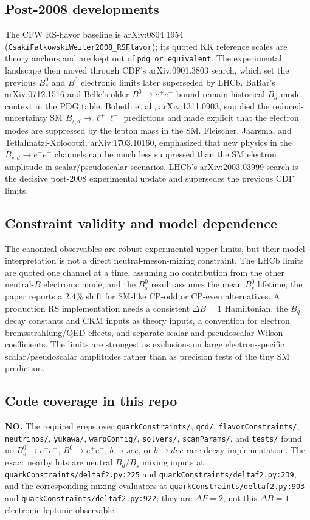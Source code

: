 \subsection*{Post-2008 developments}
The CFW RS-flavor baseline is arXiv:0804.1954
(\texttt{CsakiFalkowskiWeiler2008\_RSFlavor}); its quoted KK reference scales
are theory anchors and are kept out of \texttt{pdg\_or\_equivalent}.  The
experimental landscape then moved through CDF's arXiv:0901.3803 search, which
set the previous \(B_s^0\) and \(B^0\) electronic limits later superseded by
LHCb.  BaBar's arXiv:0712.1516 and Belle's older \(B^0\to e^+e^-\) bound remain
historical \(B_d\)-mode context in the PDG table.  Bobeth et al.,
arXiv:1311.0903, supplied the reduced-uncertainty SM \(B_{s,d}\to\ell^+\ell^-\)
predictions and made explicit that the electron modes are suppressed by the
lepton mass in the SM.  Fleischer, Jaarsma, and Tetlalmatzi-Xolocotzi,
arXiv:1703.10160, emphasized that new physics in the \(B_{s,d}\to e^+e^-\)
channels can be much less suppressed than the SM electron amplitude in
scalar/pseudoscalar scenarios.  LHCb's arXiv:2003.03999 search is the decisive
post-2008 experimental update and supersedes the previous CDF limits.

\subsection*{Constraint validity and model dependence}
The canonical observables are robust experimental upper limits, but their model
interpretation is not a direct neutral-meson-mixing constraint.  The LHCb limits
are quoted one channel at a time, assuming no contribution from the other
neutral-\(B\) electronic mode, and the \(B_s^0\) result assumes the mean
\(B_s^0\) lifetime; the paper reports a \(2.4\%\) shift for SM-like CP-odd or
CP-even alternatives.  A production RS implementation needs a consistent
\(\Delta B=1\) Hamiltonian, the \(B_q\) decay constants and CKM inputs as
theory inputs, a convention for electron bremsstrahlung/QED effects, and
separate scalar and pseudoscalar Wilson coefficients.  The limits are strongest
as exclusions on large electron-specific scalar/pseudoscalar amplitudes rather
than as precision tests of the tiny SM prediction.

\subsection*{Code coverage in this repo}
\textbf{NO.}  The required greps over \texttt{quarkConstraints/},
\texttt{qcd/}, \texttt{flavorConstraints/}, \texttt{neutrinos/},
\texttt{yukawa/}, \texttt{warpConfig/}, \texttt{solvers/},
\texttt{scanParams/}, and \texttt{tests/} found no \(B_s^0\to e^+e^-\),
\(B^0\to e^+e^-\), \(b\to s e e\), or \(b\to d e e\) rare-decay
implementation.  The exact nearby hits are neutral \(B_d/B_s\) mixing inputs at
\texttt{quarkConstraints/deltaf2.py:225} and
\texttt{quarkConstraints/deltaf2.py:239}, and the corresponding mixing
evaluators at \texttt{quarkConstraints/deltaf2.py:903} and
\texttt{quarkConstraints/deltaf2.py:922}; they are \(\Delta F=2\), not this
\(\Delta B=1\) electronic leptonic observable.

